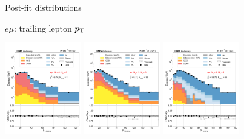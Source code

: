 \begin{frame}{Post-fit distributions}

    \begin{tcolorbox}{$e\mu$: trailing lepton $p_{\mathrm{T}}$}
        \begin{center}
            \includegraphics[width=0.25\textwidth]{chapters/Analysis/sectionStatisticalAnalysis/figures/fit/emu_cat_eq0_eq0_a}
            \includegraphics[width=0.25\textwidth]{chapters/Analysis/sectionStatisticalAnalysis/figures/fit/emu_cat_eq1_eq0_a}
            \includegraphics[width=0.25\textwidth]{chapters/Analysis/sectionStatisticalAnalysis/figures/fit/emu_cat_eq1_eq1_a}


\end{center}
\end{tcolorbox}
\end{frame}
